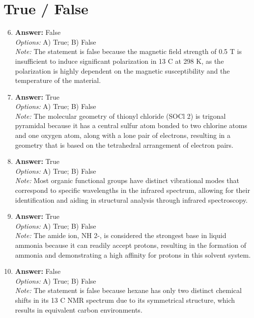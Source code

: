 \documentclass[12pt]{article}
\begin{document}
\section*{True / False}
\begin{enumerate}[label=\arabic*.]
\setcounter{enumi}{5}
\item \textbf{Answer:} False
\\ \textit{Options:} A) True; B) False
\\ \textit{Note:} The statement is false because the magnetic field strength of 0.5 T is insufficient to induce significant polarization in 13 C at 298 K, as the polarization is highly dependent on the magnetic susceptibility and the temperature of the material.
\item \textbf{Answer:} True
\\ \textit{Options:} A) True; B) False
\\ \textit{Note:} The molecular geometry of thionyl chloride (SOCl 2) is trigonal pyramidal because it has a central sulfur atom bonded to two chlorine atoms and one oxygen atom, along with a lone pair of electrons, resulting in a geometry that is based on the tetrahedral arrangement of electron pairs.
\item \textbf{Answer:} True
\\ \textit{Options:} A) True; B) False
\\ \textit{Note:} Most organic functional groups have distinct vibrational modes that correspond to specific wavelengths in the infrared spectrum, allowing for their identification and aiding in structural analysis through infrared spectroscopy.
\item \textbf{Answer:} True
\\ \textit{Options:} A) True; B) False
\\ \textit{Note:} The amide ion, NH 2-, is considered the strongest base in liquid ammonia because it can readily accept protons, resulting in the formation of ammonia and demonstrating a high affinity for protons in this solvent system.
\item \textbf{Answer:} False
\\ \textit{Options:} A) True; B) False
\\ \textit{Note:} The statement is false because hexane has only two distinct chemical shifts in its 13 C NMR spectrum due to its symmetrical structure, which results in equivalent carbon environments.
\end{enumerate}
\end{document}

